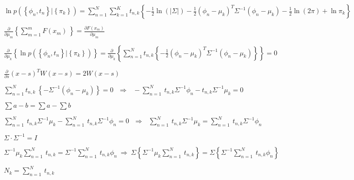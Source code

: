 \documentclass{article}
\begin{document}
$\displaystyle
    \ln{
        p\left(\left\{\phi_n,t_n\right\}|\left\{\pi_k\right\}\right)
    }=\sum_{n=1}^{N}{
        \sum_{k=1}^{K}{t_{n,k}{
            \left\{-\frac{1}{2}\ln{\left(\left|\Sigma\right|\right)}-\frac{1}{2}\left(\phi_n-\mu_k\right)^T\Sigma^{-1}\left(\phi_n-\mu_k\right)-\frac{1}{2}\ln{\left(2\pi\right)}+\ln{\pi_k}\right\}}
        }
    }
$
\begin{center}
    $\displaystyle \frac{\partial}{\partial\mu_m}\left\{\sum_{m=1}^{m}{F\left(x_m\right)\ }\right\}=\frac{\partial F\left(x_m\right)}{\partial\mu_m}$
\end{center}

$ \displaystyle
    \frac{\partial}{\partial\mu_k}\left\{\ln{p\left(\left\{\phi_n,t_n\right\}|\left\{\pi_k\right\}\right)}\right\}=\frac{\partial}{\partial\mu_k}\left\{\sum_{n=1}^{N}{t_{n,k}\left\{-\frac{1}{2}\left(\phi_n-\mu_k\right)^T\Sigma^{-1}\left(\phi_n-\mu_k\right)\right\}}\right\}=0
$

\begin{center}
    $ \displaystyle \frac{\partial}{\partial s}\left(x-s\right)^TW\left(x-s\right)=2W\left(x-s\right) $
\end{center}

$ \displaystyle
    \sum_{n=1}^{N}{t_{n,k}\ \left\{-\Sigma^{-1}\left(\phi_n-\mu_k\right)\right\}}=0\ \ \ \Longrightarrow\ \ \ -\sum_{n=1}^{N}{\ t_{n,k}\Sigma^{-1}\phi_n-t_{n,k}\Sigma^{-1}\mu_k}=0
$

\begin{center}
    $\displaystyle  \sum{a-b}=\sum a-\sum b $
\end{center}

$ \displaystyle
    \sum_{n=1}^{N}{\ t_{n,k}\Sigma^{-1}\mu_k}-\sum_{n=1}^{N}{\ t_{n,k}\Sigma^{-1}\phi_n}=0\ \ \ \Longrightarrow\ \ \ \sum_{n=1}^{N}{\ t_{n,k}\Sigma^{-1}\mu_k}=\sum_{n=1}^{N}{\ t_{n,k}\Sigma^{-1}\phi_n}
$

\begin{center}
    $ \displaystyle \Sigma \cdot \Sigma^{-1}=I $
\end{center}

$ \displaystyle
    \Sigma^{-1}\mu_k\sum_{n=1}^{N}{\ t_{n,k}}=\Sigma^{-1}\sum_{n=1}^{N}{\ t_{n,k}\phi_n}\ \Longrightarrow\ \Sigma\left\{\Sigma^{-1}\mu_k\sum_{n=1}^{N}{\ t_{n,k}}\right\}=\Sigma\left\{\Sigma^{-1}\sum_{n=1}^{N}{\ t_{n,k}\phi_n}\right\}\ \ 
$

\begin{center}
    $ \displaystyle N_k=\sum_{n=1}^{N}{\ t_{n,k}} $
\end{center}
\end{document}
